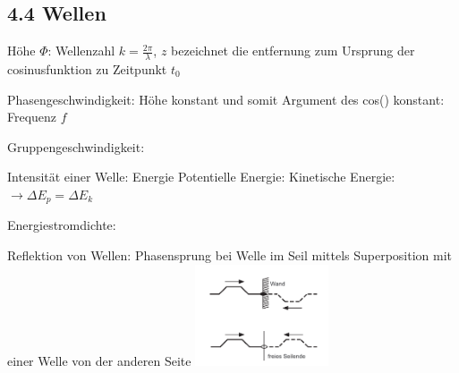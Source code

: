 \subsection*{4.4 Wellen}
    Höhe $\Phi$:
    Wellenzahl $k = \frac{2 \pi}{\lambda}$, $z$ bezeichnet die entfernung zum Ursprung der cosinusfunktion zu Zeitpunkt $t_0$

    Phasengeschwindigkeit: Höhe konstant und somit Argument des cos() konstant:
    Frequenz $f$

    Gruppengeschwindigkeit:


    Intensität einer Welle: Energie
    Potentielle Energie:
    Kinetische Energie:
    $\rightarrow \Delta E_p = \Delta E_k$  

    Energiestromdichte:

    Reflektion von Wellen:
    Phasensprung bei Welle im Seil mittels Superposition mit einer Welle von der anderen Seite
    \centering
    \includegraphics[height = 30mm]{src/images/welle_superposition.png}
